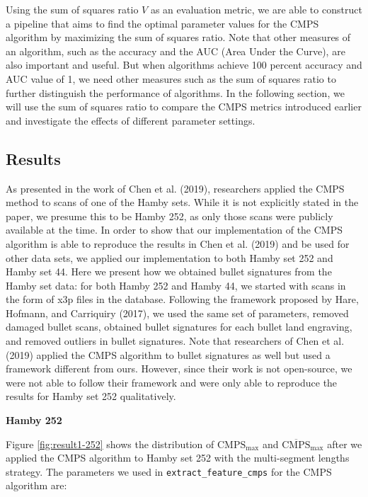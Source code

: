 Using the sum of squares ratio \(V\) as an evaluation metric, we are able to construct a pipeline that aims to find the optimal parameter values for the CMPS algorithm by maximizing the sum of squares ratio.
Note that other measures of an algorithm, such as the accuracy and the AUC (Area Under the Curve), are also important and useful. But when algorithms achieve 100 percent accuracy and AUC value of 1, we need other measures such as the sum of squares ratio to further distinguish the performance of algorithms. In the following section, we will use the sum of squares ratio to compare the CMPS metrics introduced earlier and investigate the effects of different parameter settings.

\hypertarget{results}{%
\subsection{Results}\label{results}}

As presented in the work of Chen et al. (2019), researchers applied the CMPS method to scans of one of the Hamby sets.
While it is not explicitly stated in the paper, we presume this to be Hamby 252, as only those scans were publicly available at the time.
In order to show that our implementation of the CMPS algorithm is able to reproduce the results in Chen et al. (2019) and be used for other data sets, we applied our implementation to both Hamby set 252 and Hamby set 44.
Here we present how we obtained bullet signatures from the Hamby set data: for both Hamby 252 and Hamby 44, we started with scans in the form of x3p files in the database.
Following the framework proposed by Hare, Hofmann, and Carriquiry (2017), we used the same set of parameters, removed damaged bullet scans, obtained bullet signatures for each bullet land engraving, and removed outliers in bullet signatures.
Note that researchers of Chen et al. (2019) applied the CMPS algorithm to bullet signatures as well but used a framework different from ours.
However, since their work is not open-source, we were not able to follow their framework and were only able to reproduce the results for Hamby set 252 qualitatively.

\textbf{Hamby 252}

Figure \ref{fig:result1-252} shows the distribution of \(\mathrm{CMPS_{max}}\) and \(\mathrm{\overline{CMPS}_{max}}\) after we applied the CMPS algorithm to Hamby set 252 with the multi-segment lengths strategy.
The parameters we used in \texttt{extract\_feature\_cmps} for the CMPS algorithm are:

